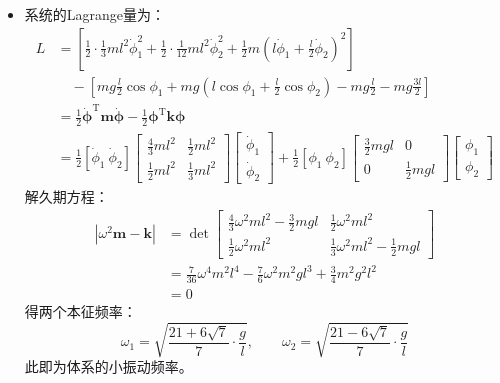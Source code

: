 \documentclass[a4paper,fontset=windows]{ctexart}
\begin{document}
\begin{itemize}
        \item[3.2]
        系统的Lagrange量为：
        \begin{align*}
            L
            &= \left[\frac{1}{2}\cdot\frac{1}{3}ml^2\dot{\phi}_1^2 + \frac{1}{2}\cdot\frac{1}{12}ml^2\dot{\phi}_2^2 + \frac{1}{2}m\left(l\dot{\phi}_1+\frac{l}{2}\dot{\phi}_2\right)^2\right] \\
            &\quad - \left[mg\frac{l}{2}\cos\phi_1 + mg(l\cos\phi_1+\frac{l}{2}\cos\phi_2) - mg\frac{l}{2} - mg\frac{3l}{2}\right] \\
            &= \frac{1}{2}\boldsymbol{\dot{\phi}}^{\mathrm{T}}\boldsymbol{m}\boldsymbol{\dot{\phi}} - \frac{1}{2}\boldsymbol{\phi}^{\mathrm{T}}\boldsymbol{k}\boldsymbol{\phi} \\
            &= \frac{1}{2}
            [\dot{\phi}_1\ \dot{\phi}_2]
            \begin{bmatrix}
                \frac{4}{3}ml^2 & \frac{1}{2}ml^2 \\
                \frac{1}{2}ml^2 & \frac{1}{3}ml^2
            \end{bmatrix}
            \begin{bmatrix}
                \dot{\phi}_1 \\
                \dot{\phi}_2
            \end{bmatrix}
            + \frac{1}{2}
            [\phi_1\ \phi_2]
            \begin{bmatrix}
                \frac{3}{2}mgl & 0 \\
                0 & \frac{1}{2}mgl
            \end{bmatrix}
            \begin{bmatrix}
                \phi_1 \\
                \phi_2
            \end{bmatrix}
        \end{align*}
        解久期方程：
        \begin{align*}
        \left|\omega^2\boldsymbol{m}- \boldsymbol{k}\right|
        &= \det
        \begin{bmatrix}
            \frac{4}{3}\omega^2ml^2-\frac{3}{2}mgl & \frac{1}{2}\omega^2ml^2 \\
            \frac{1}{2}\omega^2ml^2 & \frac{1}{3}\omega^2ml^2-\frac{1}{2}mgl
        \end{bmatrix} \\
        &= \frac{7}{36}\omega^4m^2l^4 - \frac{7}{6}\omega^2m^2gl^3 + \frac{3}{4}m^2g^2l^2 \\
        &= 0
        \end{align*}
        得两个本征频率：
        \[
        \omega_1 = \sqrt{\frac{21+6\sqrt{7}}{7}\cdot\frac{g}{l}},\qquad \omega_2 = \sqrt{\frac{21-6\sqrt{7}}{7}\cdot\frac{g}{l}}
        \]
        此即为体系的小振动频率。


\end{itemize}
\end{document}
